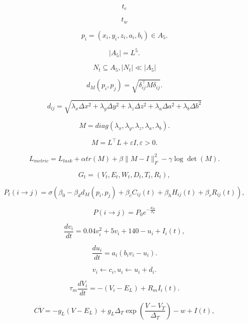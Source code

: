 \[
t_{e}
\]

\[
t_{w}
\]

\[
p_{i} = \left( x_{i},y_{i},z_{i},a_{i},b_{i} \right) \in A_{5}.
\]

\[
\left| A_{5} \right| = L^{5}.
\]

\[
N_{t} \subseteq A_{5},\left| N_{t} \right| \ll \left| A_{5} \right|
\]

\[
d_{M}\left( p_{i},p_{j} \right) = \sqrt{\delta_{ij}^{\top}M\delta_{ij}}.
\]

\[
d_{ij} = \sqrt{\lambda_{x}\Delta x^{2} + \lambda_{y}\Delta y^{2} + \lambda_{z}\Delta z^{2} + \lambda_{a}\Delta a^{2} + \lambda_{b}\Delta b^{2}}
\]

\[
M = diag\left( \lambda_{x},\lambda_{y},\lambda_{z},\lambda_{a},\lambda_{b} \right).
\]

\[
M = L^{\top}L + \varepsilon I,\varepsilon > 0.
\]

\[
L_{metric} = L_{task} + \alpha tr(M) + \beta \parallel M - I \parallel_{F}^{2} - \gamma\log\det(M).
\]

\[
G_{t} = \left( V_{t},E_{t},W_{t},D_{t},T_{t},R_{t} \right),
\]

\[
P_{t}(i \rightarrow j) = \sigma\left( \beta_{0} - \beta_{d}d_{M}\left( p_{i},p_{j} \right) + \beta_{c}C_{ij}(t) + \beta_{h}H_{ij}(t) + \beta_{r}R_{ij}(t) \right),
\]

\[
P(i \rightarrow j) = P_{0}e^{- \frac{d_{M}}{\sigma_{d}}}
\]

\[
\frac{dv_{i}}{dt} = 0.04v_{i}^{2} + 5v_{i} + 140 - u_{i} + I_{i}(t),
\]

\[
\frac{du_{i}}{dt} = a_{i}\left( b_{i}v_{i} - u_{i} \right).
\]

\[
v_{i} \leftarrow c_{i},u_{i} \leftarrow u_{i} + d_{i}.
\]

\[
\tau_{m}\frac{dV_{i}}{dt} = - \left( V_{i} - E_{L} \right) + R_{m}I_{i}(t).
\]

\[
C\dot{V} = - g_{L}\left( V - E_{L} \right) + g_{L}\Delta_{T}\exp\left( \frac{V - V_{T}}{\Delta_{T}} \right) - w + I(t),
\]

